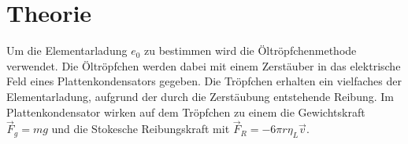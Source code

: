 \section{Theorie}
\label{sec:Theorie}
Um die Elementarladung $e_0$ zu bestimmen wird die Öltröpfchenmethode verwendet.
Die Öltröpfchen werden dabei mit einem Zerstäuber in das elektrische Feld eines Plattenkondensators gegeben.
Die Tröpfchen erhalten ein vielfaches der Elementarladung, aufgrund der durch die Zerstäubung entstehende Reibung.
Im Plattenkondensator wirken auf dem Tröpfchen zu einem die Gewichtskraft $\vec{F}_g = mg$ und die Stokesche Reibungskraft mit
$\vec{F}_R = -6 \pi r \eta_L \vec{v}$.




\cite{sample}
